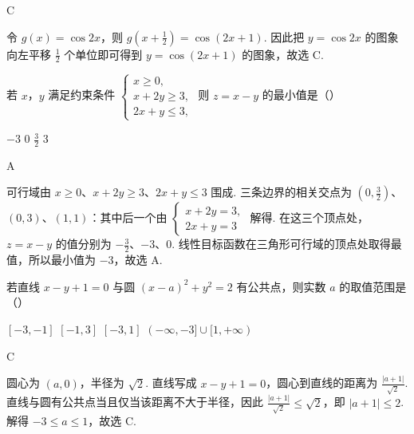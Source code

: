 \begin{answer}
C
\end{answer}

\begin{solution}
令 \(g(x)=\cos 2x\)，则 \(g\left(x+\frac{1}{2}\right)=\cos(2x+1)\). 因此把 \(y=\cos 2x\) 的图象向左平移 \(\frac{1}{2}\) 个单位即可得到 \(y=\cos(2x+1)\) 的图象，故选 C.
\end{solution}

\begin{problem}
若 \(x\)，\(y\) 满足约束条件 \(\begin{cases}
x \geqslant 0,\\
x + 2y \geqslant 3,\\
2x + y \leqslant 3,
\end{cases}\) 则 \(z = x - y\) 的最小值是（\quad）

\choices
    {\(-3\)}
    {0}
    {\( \frac{3}{2} \)}
    {3}
\end{problem}

\begin{answer}
A
\end{answer}

\begin{solution}
可行域由 \(x\geqslant0\)、\(x+2y\geqslant3\)、\(2x+y\leqslant3\) 围成. 三条边界的相关交点为 \((0,\frac{3}{2})\)、\((0,3)\)、\((1,1)\)：其中后一个由
\(\begin{cases}
x+2y=3,\\
2x+y=3
\end{cases}\) 解得. 在这三个顶点处，\(z=x-y\) 的值分别为 \(-\frac{3}{2}\)、\(-3\)、\(0\). 线性目标函数在三角形可行域的顶点处取得最值，所以最小值为 \(-3\)，故选 A.
\end{solution}

\begin{problem}
若直线 \(x - y + 1 = 0\) 与圆 \((x - a)^2 + y^2 = 2\) 有公共点，则实数 \(a\) 的取值范围是（\quad）

\choices
    {\([-3, - 1]\)}
    {\([-1, 3]\)}
    {\([-3, 1]\)}
    {\((- \infty, -3] \cup [1, +\infty)\)}
\end{problem}

\begin{answer}
C
\end{answer}

\begin{solution}
圆心为 \((a,0)\)，半径为 \(\sqrt{2}\). 直线写成 \(x-y+1=0\)，圆心到直线的距离为 \(\frac{|a+1|}{\sqrt{2}}\). 直线与圆有公共点当且仅当该距离不大于半径，因此 \(\frac{|a+1|}{\sqrt{2}}\leqslant\sqrt{2}\)，即 \(|a+1|\leqslant2\). 解得 \(-3\leqslant a\leqslant1\)，故选 C.
\end{solution}

